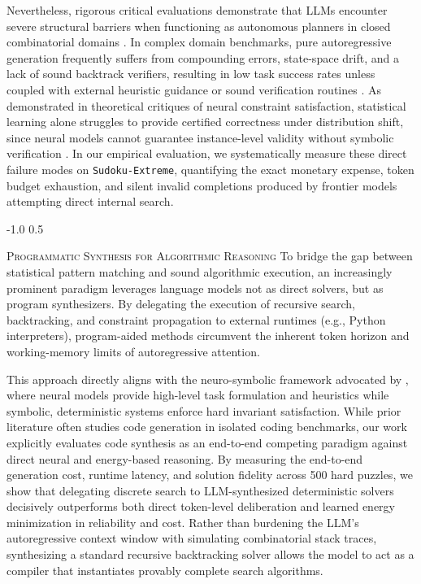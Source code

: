 \documentclass{article} %
\makeatletter
\renewcommand{\subsection}{\@startsection{subsection}{2}{\z@}%
  {-1.0\baselineskip}%
  {0.5\baselineskip}%
  {\normalfont\fontsize{10pt}{12pt}\selectfont\scshape\raggedright}}
\makeatother
\begin{document}
Nevertheless, rigorous critical evaluations demonstrate that LLMs encounter severe structural barriers when functioning as autonomous planners in closed combinatorial domains \citep{Valmeekam2023PlanningAbilities}. In complex domain benchmarks, pure autoregressive generation frequently suffers from compounding errors, state-space drift, and a lack of sound backtrack verifiers, resulting in low task success rates unless coupled with external heuristic guidance or sound verification routines \citep{Valmeekam2023PlanningAbilities}. As demonstrated in theoretical critiques of neural constraint satisfaction, statistical learning alone struggles to provide certified correctness under distribution shift, since neural models cannot guarantee instance-level validity without symbolic verification \citep{Kong2026PositionCertified}. In our empirical evaluation, we systematically measure these direct failure modes on \texttt{Sudoku-Extreme}, quantifying the exact monetary expense, token budget exhaustion, and silent invalid completions produced by frontier models attempting direct internal search.

\subsection{\textsc{Programmatic Synthesis for Algorithmic Reasoning}}
To bridge the gap between statistical pattern matching and sound algorithmic execution, an increasingly prominent paradigm leverages language models not as direct solvers, but as program synthesizers. By delegating the execution of recursive search, backtracking, and constraint propagation to external runtimes (e.g., Python interpreters), program-aided methods circumvent the inherent token horizon and working-memory limits of autoregressive attention. 

This approach directly aligns with the neuro-symbolic framework advocated by \citet{Kong2026PositionCertified}, where neural models provide high-level task formulation and heuristics while symbolic, deterministic systems enforce hard invariant satisfaction. While prior literature often studies code generation in isolated coding benchmarks, our work explicitly evaluates code synthesis as an end-to-end competing paradigm against direct neural and energy-based reasoning. By measuring the end-to-end generation cost, runtime latency, and solution fidelity across 500 hard puzzles, we show that delegating discrete search to LLM-synthesized deterministic solvers decisively outperforms both direct token-level deliberation and learned energy minimization in reliability and cost. Rather than burdening the LLM's autoregressive context window with simulating combinatorial stack traces, synthesizing a standard recursive backtracking solver allows the model to act as a compiler that instantiates provably complete search algorithms.
\end{document}
